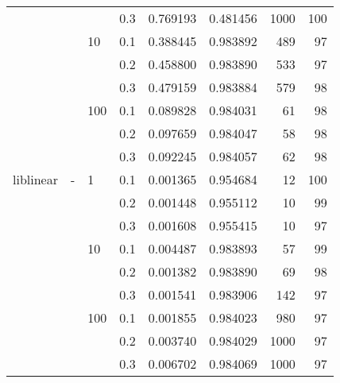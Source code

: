 \begin{table}[H]
\begin{tabular}{llllrrrr}
          &   &     & 0.3 &  0.769193 &  0.481456 &    1000 &   100 \\
          &   & 10  & 0.1 &  0.388445 &  0.983892 &     489 &    97 \\
          &   &     & 0.2 &  0.458800 &  0.983890 &     533 &    97 \\
          &   &     & 0.3 &  0.479159 &  0.983884 &     579 &    98 \\
          &   & 100 & 0.1 &  0.089828 &  0.984031 &      61 &    98 \\
          &   &     & 0.2 &  0.097659 &  0.984047 &      58 &    98 \\
          &   &     & 0.3 &  0.092245 &  0.984057 &      62 &    98 \\
liblinear & - & 1   & 0.1 &  0.001365 &  0.954684 &      12 &   100 \\
          &   &     & 0.2 &  0.001448 &  0.955112 &      10 &    99 \\
          &   &     & 0.3 &  0.001608 &  0.955415 &      10 &    97 \\
          &   & 10  & 0.1 &  0.004487 &  0.983893 &      57 &    99 \\
          &   &     & 0.2 &  0.001382 &  0.983890 &      69 &    98 \\
          &   &     & 0.3 &  0.001541 &  0.983906 &     142 &    97 \\
          &   & 100 & 0.1 &  0.001855 &  0.984023 &     980 &    97 \\
          &   &     & 0.2 &  0.003740 &  0.984029 &    1000 &    97 \\
          &   &     & 0.3 &  0.006702 &  0.984069 &    1000 &    97 \\
\bottomrule
\end{tabular}
\end{table}
